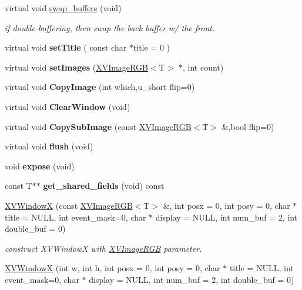 \begin{CompactItemize}
\item 
virtual void \hyperlink{class_XVWindowX_a7}{swap\_\-buffers} (void)
\begin{CompactList}\small\item\em if double-buffering, then swap the back buffer w/ the front.\item\end{CompactList}\item 
\label{XVWindowX_a8}
\hypertarget{class_XVWindowX_a8}{
virtual void {\bf set\-Title} ( const char $\ast$title = 0 )}

\item 
\label{XVWindowX_a9}
\hypertarget{class_XVWindowX_a9}{
virtual void {\bf set\-Images} (\hyperlink{class_XVImageRGB}{XVImage\-RGB}$<$T$>$ $\ast$, int count)}

\item 
\label{XVWindowX_a10}
\hypertarget{class_XVWindowX_a10}{
virtual void {\bf Copy\-Image} (int which,u\_\-short flip=0)}

\item 
virtual void {\bf Clear\-Window} (void)
\item 
\label{XVWindowX_a12}
\hypertarget{class_XVWindowX_a12}{
virtual void {\bf Copy\-Sub\-Image} (const \hyperlink{class_XVImageRGB}{XVImage\-RGB}$<$T$>$ \&,bool flip=0)}

\item 
virtual void {\bf flush} (void)
\item 
void {\bf expose} (void)
\item 
const T$\ast$$\ast$ {\bf get\_\-shared\_\-fields} (void) const
\item 
\label{XVWindowX_a16}
\hypertarget{class_XVWindowX_a16}{
\hyperlink{class_XVWindowX_a16}{XVWindow\-X} (const \hyperlink{class_XVImageRGB}{XVImage\-RGB}$<$T$>$ \&, int posx = 0, int posy = 0, char $\ast$ title = NULL, int event\_\-mask=0, char $\ast$ display = NULL, int num\_\-buf = 2, int double\_\-buf = 0)}

\begin{CompactList}\small\item\em construct XVWindow\-X with \hyperlink{class_XVImageRGB}{XVImage\-RGB} parameter.\item\end{CompactList}\item 
\label{XVWindowX_a17}
\hypertarget{class_XVWindowX_a17}{
\hyperlink{class_XVWindowX_a17}{XVWindow\-X} (int w, int h, int posx = 0, int posy = 0, char $\ast$ title = NULL, int event\_\-mask=0, char $\ast$ display = NULL, int num\_\-buf = 2, int double\_\-buf = 0)}


\end{CompactItemize}
